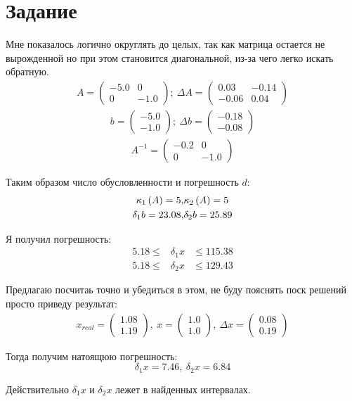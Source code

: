 \section{Задание}

Мне показалось логично округлять до целых, так как матрица остается не вырожденной
но при этом становится диагональной, из-за чего легко искать обратную. 
\begin{gather}
    A = 
    \begin{pmatrix}
        -5.0 & 0\\ 
        0 & -1.0
    \end{pmatrix}
    ;
    \
    \Delta A =
    \begin{pmatrix}
        0.03 & -0.14\\ 
        -0.06 & 0.04
    \end{pmatrix}
\end{gather}
\begin{gather}
    b = 
    \begin{pmatrix}
        -5.0\\ 
        -1.0
    \end{pmatrix};
    \
    \Delta b = 
    \begin{pmatrix}
        -0.18\\ 
        -0.08
    \end{pmatrix}
\end{gather}
\begin{gather}
    A^{-1} =
    \begin{pmatrix}
        -0.2 & 0\\ 
        0 & -1.0
    \end{pmatrix}
\end{gather}

Таким образом число обусловленности и погрешность $d$:
\begin{eqnarray}
    \kappa_1 \left( A \right) = 5, & \kappa_2 \left( A \right) = 5 \\
    \delta_1 b = 23.08, & \delta_2 b = 25.89
\end{eqnarray}

Я получил погрешность:
\begin{eqnarray}
    5.18 \leq &\delta_1 x& \leq 115.38 \\
    5.18 \leq &\delta_2 x& \leq 129.43
\end{eqnarray}

Предлагаю посчитаь точно и убедиться в этом, 
не буду пояснять поск решений просто приведу результат:
\begin{gather}
    x_{real} = \begin{pmatrix}
        1.08\\ 
        1.19
    \end{pmatrix},
    \
    x = 
    \begin{pmatrix}
        1.0\\ 
        1.0
    \end{pmatrix},
    \
    \Delta x = 
    \begin{pmatrix}
        0.08\\ 
        0.19
    \end{pmatrix}
\end{gather}

Тогда получим натоящюю погрешность:
\begin{equation}
    \delta_1 x = 7.46, \
    \delta_2 x = 6.84
\end{equation}

Действительно $\delta_1 x$ и $\delta_2 x$ лежет в найденных интервалах.


